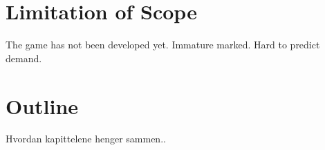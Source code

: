 \section{Limitation of Scope}
The game has not been developed yet. Immature marked. Hard to predict demand. 

\section{Outline}
Hvordan kapittelene henger sammen..